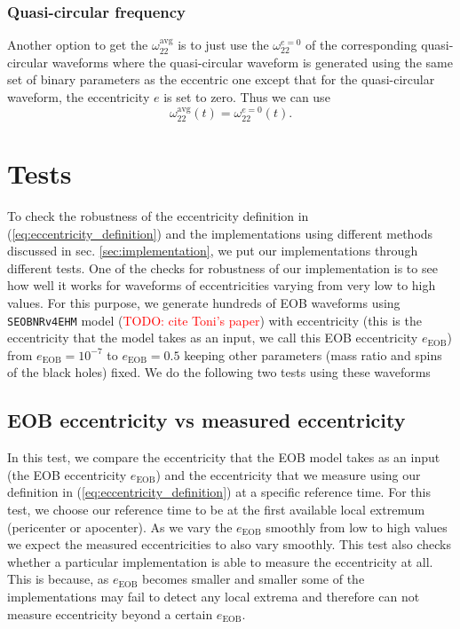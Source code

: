 \documentclass[aps,prd,amsmath,floats,floatfix, twocolumn,
superscriptaddress,nofootinbib,showpacs]{revtex4-1}
\newcommand{\red}{\textcolor{red}}
\newcommand{\TODO}[1]{\red{TODO: #1}}
\begin{document}
\subsubsection{Quasi-circular frequency}
\label{sec:quasi-circular-frequency}
Another option to get the $\omega_{22}^{\text{avg}}$ is to just use
the $\omega_{22}^{e=0}$ of the corresponding quasi-circular waveforms
where the quasi-circular waveform is generated using the same set of
binary parameters as the eccentric one except that for the
quasi-circular waveform, the eccentricity $e$ is set to zero. Thus we
can use
\begin{equation}
  \label{eq:quasi-circular-frequency}
  \omega^{\text{avg}}_{22}(t) = \omega_{22}^{e=0}(t).
\end{equation}

\section{Tests}
\label{sec:tests}
To check the robustness of the eccentricity definition in
(\ref{eq:eccentricity_definition}) and the implementations using
different methods discussed in sec. \ref{sec:implementation}, we put
our implementations through different tests. One of the checks for
robustness of our implementation is to see how well it works for
waveforms of eccentricities varying from very low to high values. For
this purpose, we generate hundreds of EOB waveforms using
\texttt{SEOBNRv4EHM} model (\TODO{cite Toni's paper}) with
eccentricity (this is the eccentricity that the model takes as an
input, we call this EOB eccentricity $e_{\text{EOB}}$) from
$e_{\text{EOB}} = 10^{-7}$ to $e_{\text{EOB}} = 0.5$ keeping other
parameters (mass ratio and spins of the black holes) fixed. We do the
following two tests using these waveforms

\subsection{EOB eccentricity vs measured eccentricity}
\label{sec:eob-eccentricity-vs-measured-eccentricity} In this test, we
compare the eccentricity that the EOB model takes as an input (the EOB
eccentricity $e_{\text{EOB}}$) and the eccentricity that we measure
using our definition in (\ref{eq:eccentricity_definition}) at a
specific reference time. For this test, we choose our reference time
to be at the first available local extremum (pericenter or
apocenter). As we vary the $e_{\text{EOB}}$ smoothly from low to high
values we expect the measured eccentricities to also vary smoothly.
This test also checks whether a particular implementation is able to
measure the eccentricity at all. This is because, as $e_{\text{EOB}}$
becomes smaller and smaller some of the implementations may fail to
detect any local extrema and therefore can not measure eccentricity
beyond a certain $e_{\text{EOB}}$.
\end{document}
